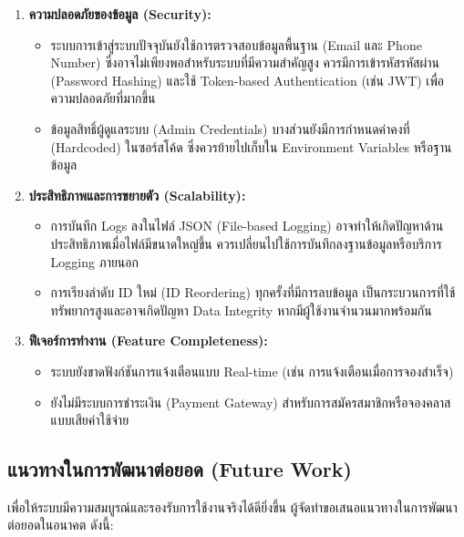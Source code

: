 \begin{enumerate}
    \item \textbf{ความปลอดภัยของข้อมูล (Security):} \newline
    \begin{itemize}
        \item ระบบการเข้าสู่ระบบปัจจุบันยังใช้การตรวจสอบข้อมูลพื้นฐาน (Email และ Phone Number) ซึ่งอาจไม่เพียงพอสำหรับระบบที่มีความสำคัญสูง ควรมีการเข้ารหัสรหัสผ่าน (Password Hashing) และใช้ Token-based Authentication (เช่น JWT) เพื่อความปลอดภัยที่มากขึ้น
        \item ข้อมูลสิทธิ์ผู้ดูแลระบบ (Admin Credentials) บางส่วนยังมีการกำหนดค่าคงที่ (Hardcoded) ในซอร์สโค้ด ซึ่งควรย้ายไปเก็บใน Environment Variables หรือฐานข้อมูล
    \end{itemize}

    \item \textbf{ประสิทธิภาพและการขยายตัว (Scalability):} \newline
    \begin{itemize}
        \item การบันทึก Logs ลงในไฟล์ JSON (File-based Logging) อาจทำให้เกิดปัญหาด้านประสิทธิภาพเมื่อไฟล์มีขนาดใหญ่ขึ้น ควรเปลี่ยนไปใช้การบันทึกลงฐานข้อมูลหรือบริการ Logging ภายนอก
        \item การเรียงลำดับ ID ใหม่ (ID Reordering) ทุกครั้งที่มีการลบข้อมูล เป็นกระบวนการที่ใช้ทรัพยากรสูงและอาจเกิดปัญหา Data Integrity หากมีผู้ใช้งานจำนวนมากพร้อมกัน
    \end{itemize}

    \item \textbf{ฟีเจอร์การทำงาน (Feature Completeness):} \newline
    \begin{itemize}
        \item ระบบยังขาดฟังก์ชันการแจ้งเตือนแบบ Real-time (เช่น การแจ้งเตือนเมื่อการจองสำเร็จ)
        \item ยังไม่มีระบบการชำระเงิน (Payment Gateway) สำหรับการสมัครสมาชิกหรือจองคลาสแบบเสียค่าใช้จ่าย
    \end{itemize}
\end{enumerate}

\subsection{แนวทางในการพัฒนาต่อยอด (Future Work)}
เพื่อให้ระบบมีความสมบูรณ์และรองรับการใช้งานจริงได้ดียิ่งขึ้น ผู้จัดทำขอเสนอแนวทางในการพัฒนาต่อยอดในอนาคต ดังนี้:

